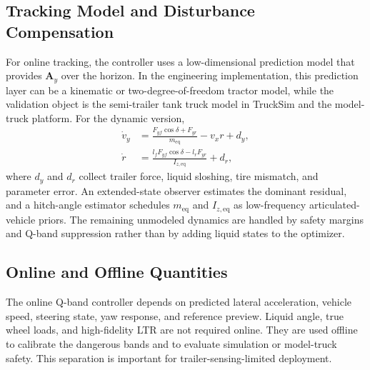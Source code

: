 \subsection{Tracking Model and Disturbance Compensation}
For online tracking, the controller uses a low-dimensional prediction model that provides $\mathbf{A}_y$ over the horizon. In the engineering implementation, this prediction layer can be a kinematic or two-degree-of-freedom tractor model, while the validation object is the semi-trailer tank truck model in TruckSim and the model-truck platform. For the dynamic version,
\begin{equation}
\begin{aligned}
    \dot v_y &= \frac{F_{yf}\cos\delta+F_{yr}}{m_{\mathrm{eq}}}-v_xr+d_y,\\
    \dot r &= \frac{l_fF_{yf}\cos\delta-l_rF_{yr}}{I_{z,\mathrm{eq}}}+d_r,
\end{aligned}
\label{eq:tractor_2dof}
\end{equation}
where $d_y$ and $d_r$ collect trailer force, liquid sloshing, tire mismatch, and parameter error. An extended-state observer estimates the dominant residual, and a hitch-angle estimator schedules $m_{\mathrm{eq}}$ and $I_{z,\mathrm{eq}}$ as low-frequency articulated-vehicle priors. The remaining unmodeled dynamics are handled by safety margins and Q-band suppression rather than by adding liquid states to the optimizer.

\subsection{Online and Offline Quantities}
The online Q-band controller depends on predicted lateral acceleration, vehicle speed, steering state, yaw response, and reference preview. Liquid angle, true wheel loads, and high-fidelity LTR are not required online. They are used offline to calibrate the dangerous bands and to evaluate simulation or model-truck safety. This separation is important for trailer-sensing-limited deployment.
